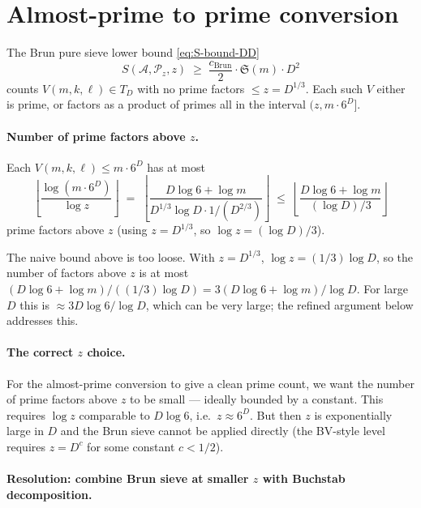 \section{Almost-prime to prime conversion}\label{sec:almost-prime}

The Brun pure sieve lower bound \eqref{eq:S-bound-DD}
\begin{equation}
  S(\mathcal{A}, \mathcal{P}_{z}, z)
    \;\geq\; \frac{c_{\mathrm{Brun}}}{2} \cdot \mathfrak{S}(m) \cdot D^{2}
\end{equation}
counts $V(m, k, \ell) \in T_{D}$ with no prime factors $\leq z =
D^{1/3}$. Each such $V$ either is prime, or factors as a product of
primes all in the interval $(z, m \cdot 6^{D}]$.

\paragraph{Number of prime factors above $z$.}
Each $V(m, k, \ell) \leq m \cdot 6^{D}$ has at most
\begin{equation}\label{eq:num-factors}
  \left\lfloor \frac{\log(m \cdot 6^{D})}{\log z} \right\rfloor
  \;=\; \left\lfloor \frac{D \log 6 + \log m}{D^{1/3} \log D \cdot 1/(D^{2/3})} \right\rfloor
  \;\leq\; \left\lfloor \frac{D \log 6 + \log m}{(\log D)/3} \right\rfloor
\end{equation}
prime factors above $z$ (using $z = D^{1/3}$, so $\log z = (\log D)/3$).

The naive bound above is too loose. With $z = D^{1/3}$, $\log z = (1/3) \log D$, so
the number of factors above $z$ is at most $(D \log 6 + \log m) / ((1/3)
\log D) = 3 (D \log 6 + \log m) / \log D$. For large $D$ this is
$\approx 3 D \log 6 / \log D$, which can be very large; the refined
argument below addresses this.

\paragraph{The correct $z$ choice.}
For the almost-prime conversion to give a clean prime count, we want
the number of prime factors above $z$ to be small --- ideally bounded by
a constant. This requires $\log z$ comparable to $D \log 6$, i.e.\
$z \approx 6^{D}$. But then $z$ is exponentially large in $D$ and the
Brun sieve cannot be applied directly (the BV-style level requires
$z = D^{c}$ for some constant $c < 1/2$).

\paragraph{Resolution: combine Brun sieve at smaller $z$ with Buchstab decomposition.}

